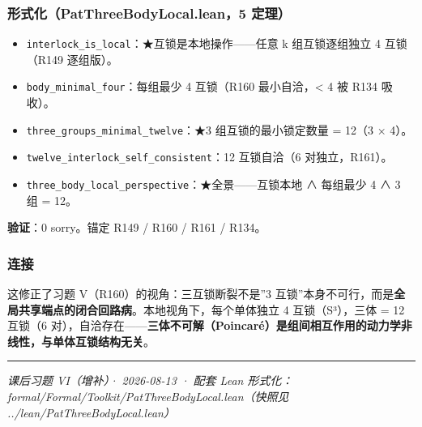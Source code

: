 \documentclass[
]{article}
\providecommand{\tightlist}{%
 \setlength{\itemsep}{0pt}\setlength{\parskip}{0pt}}
\begin{document}
\subsubsection{形式化（PatThreeBodyLocal.lean，5
定理）}\label{ux5f62ux5f0fux5316patthreebodylocal.lean5-ux5b9aux7406}

\begin{itemize}
\tightlist
\item
 \texttt{interlock\_is\_local}：★互锁是本地操作------任意 k
 组互锁逐组独立 4 互锁（R149 逐组版）。
\item
 \texttt{body\_minimal\_four}：每组最少 4 互锁（R160
 最小自洽，\textless{} 4 被 R134 吸收）。
\item
 \texttt{three\_groups\_minimal\_twelve}：★3 组互锁的最小锁定数量 =
 12（3 × 4）。
\item
 \texttt{twelve\_interlock\_self\_consistent}：12 互锁自洽（6
 对独立，R161）。
\item
 \texttt{three\_body\_local\_perspective}：★全景------互锁本地 ∧
 每组最少 4 ∧ 3 组 = 12。
\end{itemize}

\textbf{验证}：0 sorry。锚定 R149 / R160 / R161 / R134。

\subsubsection{连接}\label{ux8fdeux63a5}

这修正了习题 V（R160）的视角：三互锁断裂不是''3
互锁''本身不可行，而是\textbf{全局共享端点的闭合回路病}。本地视角下，每个单体独立
4 互锁（S³），三体 = 12 互锁（6
对），自洽存在------\textbf{三体不可解（Poincaré）是组间相互作用的动力学非线性，与单体互锁结构无关}。

\begin{center}\rule{0.5\linewidth}{0.5pt}\end{center}

\emph{课后习题 VI（增补）· 2026-08-13 · 配套 Lean
形式化：formal/Formal/Toolkit/PatThreeBodyLocal.lean（快照见
../lean/PatThreeBodyLocal.lean）}
\end{document}
